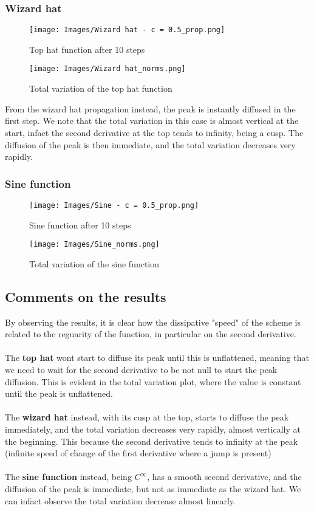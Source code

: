 \documentclass{report}
\begin{document}
\subsubsection*{Wizard hat}
\begin{figure}[H]
    \centering
    \texttt{[image: Images/Wizard hat - c = 0.5\_prop.png]}
    \caption{Top hat function after 10 steps}
    \label{fig:wiz_hat_res}
\end{figure}

\begin{figure}[H]
    \centering
    \texttt{[image: Images/Wizard hat\_norms.png]}
    \caption{Total variation of the top hat function}
    \label{fig:wiz_hat_TV}
\end{figure}
From the wizard hat propagation instead, the peak is instantly diffused in the first step. We note that
the total variation in this case is almost vertical at the start, infact the second derivative at the top
tends to infinity, being a cusp. The diffusion of the peak is then immediate, and the total variation decreases very rapidly.
\subsubsection*{Sine function}
\begin{figure}[H]
    \centering
    \texttt{[image: Images/Sine - c = 0.5\_prop.png]}
    \caption{Sine function after 10 steps}
    \label{fig:sine_res}
\end{figure}
\begin{figure}[H]
    \centering
    \texttt{[image: Images/Sine\_norms.png]}
    \caption{Total variation of the sine function}
    \label{fig:sine_TV}
\end{figure}
\subsection*{Comments on the results}
By observing the results, it is clear how the dissipative "speed" of the scheme is related to the reguarity of the function,
in particular on the second derivative.\\\\
The \textbf{top hat} wont start to diffuse its peak until this is unflattened, meaning that we need to wait for the second derivative to be not null to
start the peak diffusion. This is evident in the total variation plot, where the value is constant until the peak is unflattened.\\\\
The \textbf{wizard hat} instead, with its cusp at the top, starts to diffuse the peak immediately, and the total variation decreases very rapidly, almost vertically at the beginning.
This because the second derivative tends to infinity at the peak (infinite speed of change of the first derivative where a jump is present)\\\\
The \textbf{sine function} instead, being $C^{\infty}$, has a smooth second derivative, and the diffusion of the peak is immediate, but not as immediate as the wizard hat. We can infact observe the total variation
decrease almost linearly.
\end{document}
